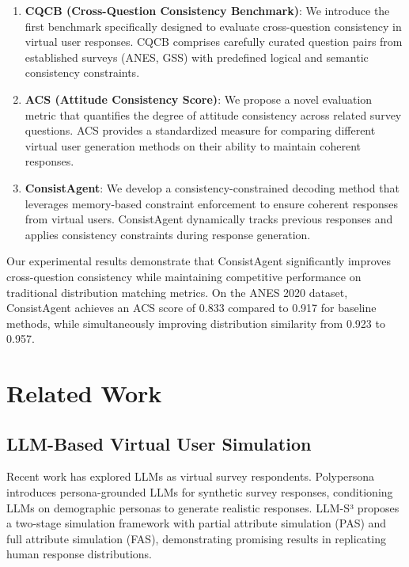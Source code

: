 \documentclass[sigconf, anonymous]{acmart}
\begin{document}
\begin{enumerate}
    \item \textbf{CQCB (Cross-Question Consistency Benchmark)}: We introduce the first benchmark specifically designed to evaluate cross-question consistency in virtual user responses. CQCB comprises carefully curated question pairs from established surveys (ANES, GSS) with predefined logical and semantic consistency constraints.
    
    \item \textbf{ACS (Attitude Consistency Score)}: We propose a novel evaluation metric that quantifies the degree of attitude consistency across related survey questions. ACS provides a standardized measure for comparing different virtual user generation methods on their ability to maintain coherent responses.
    
    \item \textbf{ConsistAgent}: We develop a consistency-constrained decoding method that leverages memory-based constraint enforcement to ensure coherent responses from virtual users. ConsistAgent dynamically tracks previous responses and applies consistency constraints during response generation.
\end{enumerate}

Our experimental results demonstrate that ConsistAgent significantly improves cross-question consistency while maintaining competitive performance on traditional distribution matching metrics. On the ANES 2020 dataset, ConsistAgent achieves an ACS score of 0.833 compared to 0.917 for baseline methods, while simultaneously improving distribution similarity from 0.923 to 0.957.

\section{Related Work}

\subsection{LLM-Based Virtual User Simulation}

Recent work has explored LLMs as virtual survey respondents. Polypersona \cite{chen2025polypersona} introduces persona-grounded LLMs for synthetic survey responses, conditioning LLMs on demographic personas to generate realistic responses. LLM-S³ \cite{wang2025large} proposes a two-stage simulation framework with partial attribute simulation (PAS) and full attribute simulation (FAS), demonstrating promising results in replicating human response distributions.
\end{document}
